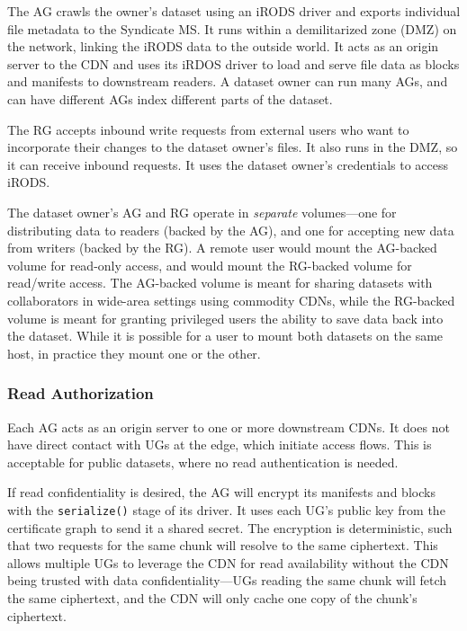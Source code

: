 The AG crawls the owner's dataset using
an iRODS driver and exports individual file metadata to the Syndicate MS.
It runs within a demilitarized zone (DMZ) on the network, linking the iRODS data
to the outside world.  It acts as an origin
server to the CDN and uses its iRDOS driver to load and serve file data as blocks and
manifests to downstream readers.  A dataset owner can run many AGs, and can have
different AGs index different parts of the dataset.

The RG accepts inbound write requests from external users who want to
incorporate their changes to the dataset owner's files.  It also runs in the
DMZ, so it can receive inbound requests.  It uses the dataset owner's
credentials to access iRODS.

The dataset owner's AG and RG operate in \emph{separate} volumes---one for
distributing data to readers (backed by the AG), and one for accepting new data
from writers (backed by the RG).  A remote user would mount the AG-backed volume
for read-only access, and would mount the RG-backed volume for read/write
access.  The AG-backed volume is meant for sharing datasets with collaborators in
wide-area settings using commodity CDNs, while the RG-backed volume is meant for
granting privileged users the ability to save data back into the dataset.
While it is possible for a user to mount
both datasets on the same host, in practice they mount one or the other.

\subsubsection{Read Authorization}

Each AG acts as an origin server to one or more downstream CDNs.  It does not
have direct contact with UGs at the edge, which initiate access flows.  This is
acceptable for public datasets, where no read authentication is needed.

If read confidentiality is desired, the AG will encrypt its
manifests and blocks with the \texttt{serialize()} stage of its driver.  It uses each
UG's public key from the certificate graph to send it a shared secret.  The
encryption is deterministic, such that two requests for the same chunk will
resolve to the same ciphertext.  This allows multiple UGs to leverage the CDN
for read availability without the CDN being trusted with data
confidentiality---UGs reading the same chunk will fetch the same ciphertext, and
the CDN will only cache one copy of the chunk's ciphertext.

